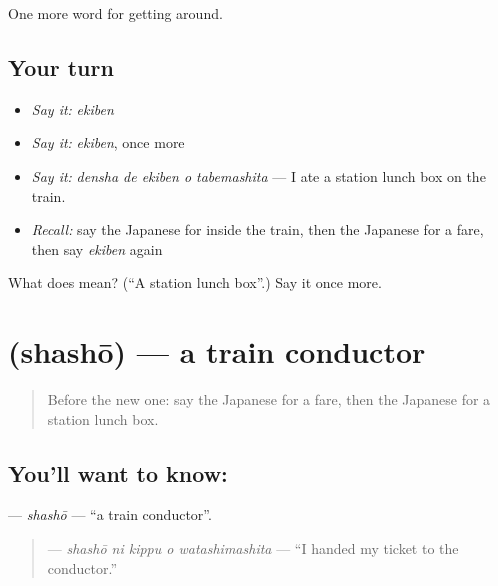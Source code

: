 \begin{grammarlens}[title={What you've built}]
One more word for getting around.
\end{grammarlens}

\subsection*{Your turn}
\begin{itemize}
\raggedright
  \item \emph{Say it:} \emph{ekiben}
  \item \emph{Say it:} \emph{ekiben}, once more
  \item \emph{Say it:} \emph{densha de ekiben o tabemashita} — I ate a station lunch box on the train.
  \item \emph{Recall:} say the Japanese for inside the train, then the Japanese for a fare, then say \emph{ekiben} again
\end{itemize}

\begin{tcolorbox}[breakable,colback=teal!4,colframe=teal!35!black,title={Before you move on}]
What does  mean? (\textquotedblleft{}A station lunch box\textquotedblright{}.) Say it once more.
\end{tcolorbox}
\section[\texorpdfstring{\ja{しゃしょう} (shashō)}{しゃしょう (shashō)}]{ (shashō) — a train conductor}

\label{lesson:JA-C380-shashou}



\begin{quote}
Before the new one: say the Japanese for a fare, then the Japanese for a station lunch box.
\end{quote}

\subsection*{You'll want to know: }
\textbf{} — \emph{shashō} — \textquotedblleft{}a train conductor\textquotedblright{}.

\begin{quote}
\textbf{  } — \emph{shashō ni kippu o watashimashita} — \textquotedblleft{}I handed my ticket to the conductor.\textquotedblright{}
\end{quote}

